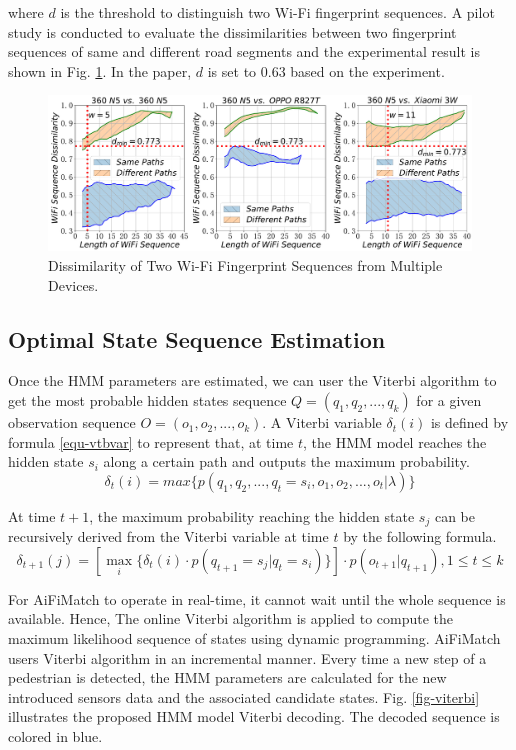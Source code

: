 \documentclass{llncs}
\begin{document}
where $d$ is the threshold to distinguish two Wi-Fi fingerprint sequences. A pilot study is conducted to evaluate the dissimilarities between two fingerprint sequences of same and different road segments and the experimental result is shown in Fig. \ref{fig-wifidist}. In the paper, $d$ is set to $0.63$ based on the experiment. 

\begin{figure}[!htbp]
	\centering
	\includegraphics[width=4.96in]{AiFiMatch-WiFiJCD}
	\caption{Dissimilarity of Two Wi-Fi Fingerprint Sequences from Multiple Devices.}
	\label{fig-wifidist}
\end{figure}

\subsection{Optimal State Sequence Estimation}

Once the HMM parameters are estimated, we can user the Viterbi algorithm to get the most probable hidden states sequence $Q = ({q_1},{q_2},...,{q_k})$ for a given observation sequence $O = ({o_1},{o_2},...,{o_k})$. A Viterbi variable ${\delta _t}(i)$ is defined by formula \ref{equ-vtbvar} to represent that, at time $t$, the HMM model reaches the hidden state $s_i$ along a certain path and outputs the maximum probability.
\begin{equation}
	\label{equ-vtbvar}
	{\delta _t}(i) = max\{ p({q_1},{q_2},...,{q_t} = {s_i},{o_1},{o_2},...,{o_t}|\lambda )\}
\end{equation}

At time $t+1$, the maximum probability reaching the hidden state $s_j$ can be recursively derived from the Viterbi variable at time $t$ by the following formula. 
\begin{equation}
	{\delta _{t + 1}}(j) = [\mathop {max}\limits_i \{ {\delta _t}(i) \cdot p({q_{t + 1}} = {s_j}|{q_t} = {s_i})\} ] \cdot p({o_{t + 1}}|{q_{t + 1}}),1 \le t \le k
\end{equation}

For AiFiMatch to operate in real-time, it cannot wait until the whole sequence is available. Hence, The online Viterbi algorithm \cite{bloit2008short} is applied to compute the maximum likelihood sequence of states using dynamic programming. AiFiMatch users Viterbi algorithm in an incremental manner. Every time a new step of a pedestrian is detected, the HMM parameters are calculated for the new introduced sensors data and the associated candidate states.  Fig. \ref{fig-viterbi} illustrates the proposed HMM model Viterbi decoding. The decoded sequence is colored in blue.
\end{document}
